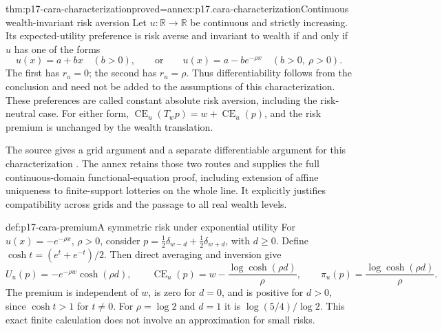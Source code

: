 \begin{hbtheorem}{thm:p17-cara-characterization}{proved=annex:p17.cara-characterization}{Continuous wealth-invariant risk aversion}
Let \(u:\mathbb R\to\mathbb R\) be continuous and strictly increasing.
Its expected-utility preference is risk averse and invariant to wealth
if and only if \(u\) has one of the forms
\[
               u(x)=a+b x\quad(b>0),
       \qquad\text{or}\qquad
               u(x)=a-b e^{-\rho x}\quad(b>0,\ \rho>0).
\]
The first has \(r_u=0\); the second has \(r_u=\rho\). Thus
differentiability follows from the conclusion and need not be added
to the assumptions of this characterization. These preferences are
called constant absolute risk aversion, including the risk-neutral case.
For either form,
\(\operatorname{CE}_u(T_wp)=w+\operatorname{CE}_u(p)\), and the
risk premium is unchanged by the wealth translation.
\end{hbtheorem}

The source gives a grid argument and a separate differentiable argument
for this characterization \cite[pp.~117--118]{Rubinstein2015LectureNotes}.
The annex retains those two routes and supplies the full continuous-domain
functional-equation proof, including extension of affine uniqueness to
finite-support lotteries on the whole line. It explicitly justifies
compatibility across grids and the passage to all real wealth levels.

\begin{hbexample}{def:p17-cara-premium}{A symmetric risk under exponential utility}
For \(u(x)=-e^{-\rho x}\), \(\rho>0\), consider
\(p=\tfrac12\delta_{w-d}+\tfrac12\delta_{w+d}\), with \(d\geq0\).
Define \(\cosh t=(e^t+e^{-t})/2\). Then direct averaging and inversion give
\[
 U_u(p)=-e^{-\rho w}\cosh(\rho d),\qquad
 \operatorname{CE}_u(p)=w-\frac{\log\cosh(\rho d)}{\rho},\qquad
 \pi_u(p)=\frac{\log\cosh(\rho d)}{\rho}.
\]
The premium is independent of \(w\), is zero for \(d=0\), and is
positive for \(d>0\), since \(\cosh t>1\) for \(t\ne0\).
For \(\rho=\log2\) and \(d=1\) it is
\(\log(5/4)/\log2\). This exact finite calculation does not involve
an approximation for small risks.
\end{hbexample}

